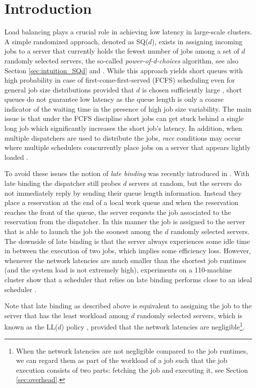 \documentclass[12pt]{report}
\begin{document}
\section{Introduction}
Load balancing plays a crucial role in achieving low latency in large-scale clusters. A simple randomized approach, denoted as SQ($d$), exists in assigning incoming jobs to a server that currently holds the fewest number of jobs among a set of $d$ randomly selected servers, the so-called {\it power-of-d-choices} algorithm, see also Section \ref{sec:intuition_SQd} and \cite{vvedenskaya3,mitzenmacher2,Mukherjee2016,aghajani2017}. While this approach yields short queues with high probability in case of first-come-first-served (FCFS) scheduling even for general job size distributions provided that $d$ is chosen sufficiently large \cite{bramsonLB,bramsonAAP}, short queues do not guarantee low latency as the
queue length is only a coarse indicator of the waiting time in the presence of high job size variability. The main issue is that under the FCFS discipline 
short jobs can get stuck behind a single long job which significantly increases the short job's latency. In addition, when multiple dispatchers are
used to distribute the jobs, {\it race} conditions may occur where multiple schedulers concurrently place jobs on a server that appears lightly loaded
\cite{mitzenmacherOLD}.

To avoid these issues the notion of {\it late binding} was recently introduced in \cite{Sparrow}. With late binding the dispatcher still probes $d$ servers
at random, but the servers do not immediately reply by sending their queue length information. Instead they place a reservation at the end of a local work queue and when the reservation
reaches the front of the queue, the server requests the job associated to the reservation from the dispatcher. In this manner the job is assigned to the server
that is able to launch the job the soonest among the $d$ randomly selected servers. The downside of late binding is that the server always experiences some
idle time in between the execution of two jobs, which implies some efficiency loss. However, whenever the network latencies are much smaller than the shortest job runtimes (and the system load is not extremely high), experiments on a 110-machine cluster show that a scheduler that relies on late binding performs close to an ideal scheduler \cite{Sparrow}.  

Note that late binding as described above is equivalent to assigning the job to the server that has the least workload among
$d$ randomly selected servers, which is known as the LL($d$) policy \cite{bramson2012asymptotic}, provided that the network latencies are negligible\footnote{When the network latencies are not negligible compared to the job runtimes, we can regard them as part of the workload of a job such that the job execution consists of two parts: fetching the job and executing it, see Section \ref{sec:overhead}.}.
\end{document}
